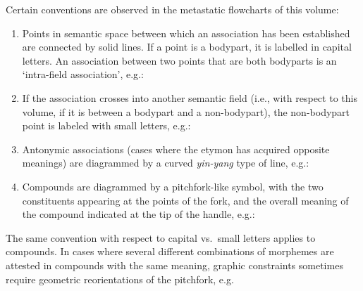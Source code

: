 Certain conventions are observed in the metastatic flowcharts of this volume:

\begin{enumerate}
\item Points in semantic space between which an association has been established
are connected by solid lines.  If a point is a bodypart, it is labelled in
capital letters.  An association between two points that are both bodyparts is
an ‘intra-field association’, e.g.:


\item If the association crosses into another semantic field (i.e., with respect
to this volume, if it is between a bodypart and a non-bodypart), the
non-bodypart point is labeled with small letters, e.g.:


\item Antonymic associations (cases where the etymon has acquired opposite
meanings) are diagrammed by a curved \textit{yin-yang} type of line, e.g.:


\item Compounds are diagrammed by a pitchfork-like symbol, with the two
constituents appearing at the points of the fork, and the overall meaning of the
compound indicated at the tip of the handle, e.g.:


\end{enumerate}

The same convention with respect to capital vs.\ small letters applies to
compounds. In cases where several different combinations of morphemes are attested in compounds with the same meaning, graphic constraints sometimes require geometric reorientations of the pitchfork, e.g.


